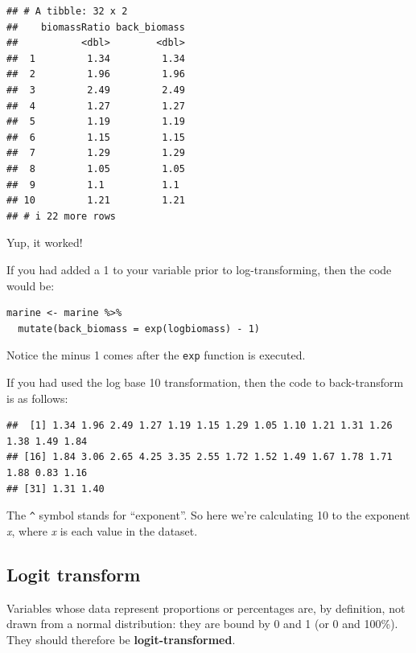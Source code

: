 \documentclass[
]{book}
\newenvironment{Shaded}{\begin{snugshade}}{\end{snugshade}}
\newcommand{\DecValTok}[1]{\textcolor[rgb]{0.00,0.00,0.81}{#1}}
\newcommand{\NormalTok}[1]{#1}
\newcommand{\SpecialCharTok}[1]{\textcolor[rgb]{0.81,0.36,0.00}{\textbf{#1}}}
\begin{document}
\begin{verbatim}
## # A tibble: 32 x 2
##    biomassRatio back_biomass
##           <dbl>        <dbl>
##  1         1.34         1.34
##  2         1.96         1.96
##  3         2.49         2.49
##  4         1.27         1.27
##  5         1.19         1.19
##  6         1.15         1.15
##  7         1.29         1.29
##  8         1.05         1.05
##  9         1.1          1.1 
## 10         1.21         1.21
## # i 22 more rows
\end{verbatim}

Yup, it worked!

If you had added a 1 to your variable prior to log-transforming, then the code would be:

\begin{verbatim}
marine <- marine %>%
  mutate(back_biomass = exp(logbiomass) - 1)
\end{verbatim}

Notice the minus 1 comes after the \texttt{exp} function is executed.

If you had used the log base 10 transformation, then the code to back-transform is as follows:

\begin{Shaded}
\end{Shaded}

\begin{verbatim}
##  [1] 1.34 1.96 2.49 1.27 1.19 1.15 1.29 1.05 1.10 1.21 1.31 1.26 1.38 1.49 1.84
## [16] 1.84 3.06 2.65 4.25 3.35 2.55 1.72 1.52 1.49 1.67 1.78 1.71 1.88 0.83 1.16
## [31] 1.31 1.40
\end{verbatim}

The \texttt{\^{}} symbol stands for ``exponent''. So here we're calculating 10 to the exponent \emph{x}, where \emph{x} is each value in the dataset.

\subsection{Logit transform}\label{logit_transform}

Variables whose data represent proportions or percentages are, by definition, not drawn from a normal distribution: they are bound by 0 and 1 (or 0 and 100\%). They should therefore be \textbf{logit-transformed}.
\end{document}
